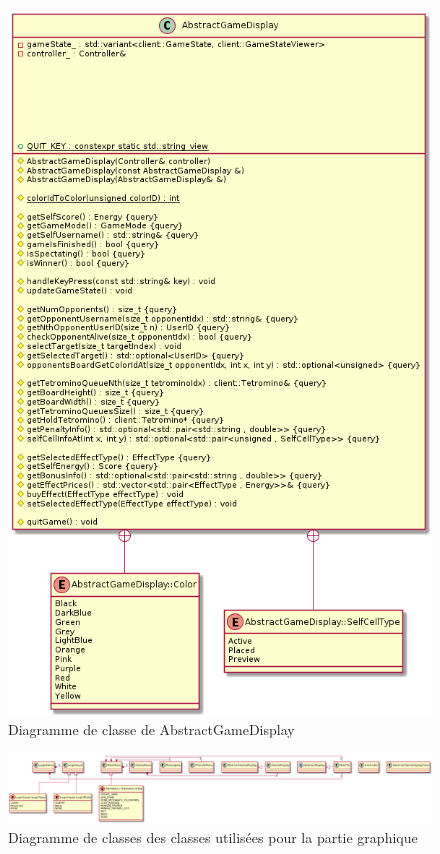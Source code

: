 \documentclass{article}
\begin{document}
\begin{figure}[H]
    \centering
    \includegraphics[scale=0.2]{../../res/uml/class/AbstractGameDisplayClass.png}
    \caption{Diagramme de classe de AbstractGameDisplay}
    \label{fig:InterfaceDiagram}
\end{figure}

\begin{figure}[H]
    \centering
    \includegraphics[width=1\textwidth]{../../res/uml/class/GraphismeStructureClass.png}
    \caption{Diagramme de classes des classes utilisées pour la partie graphique}
    \label{fig:GraphismeDiagram}
\end{figure}
\end{document}
